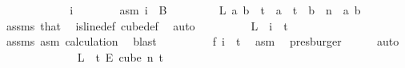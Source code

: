 \begin{isabellebody}
\ \ \ \ \isamarkupfalse%
\isanewline
\ \ \ \ \ \ \isamarkupfalse%
\ i\isanewline
\ \ \ \ \ \ \isamarkupfalse%
\ asm{\isacharcolon}{\kern0pt}\ {\isachardoublequoteopen}i\ {\isasymin}\ {\isacharparenleft}{\kern0pt}B\ {}{\isacharparenright}{\kern0pt}{\isachardoublequoteclose}\isanewline
\ \ \ \ \ \ \isamarkupfalse%
\ {\isachardoublequoteopen}L\ a\ b\ {\isasymin}\ {\isacharbraceleft}{\kern0pt}{\isachardot}{\kern0pt}{\isachardot}{\kern0pt}{\isacharless}{\kern0pt}t{\isacharbraceright}{\kern0pt}{\isachardoublequoteclose}\ \ {\isachardoublequoteopen}a\ {\isacharless}{\kern0pt}\ t{\isachardoublequoteclose}\ \ {\isachardoublequoteopen}b\ {\isacharless}{\kern0pt}\ n{\isachardoublequoteclose}\ \ a\ b\ \isamarkupfalse%
\ assms{\isacharparenleft}{\kern0pt}{}{\isacharparenright}{\kern0pt}\ that\ \isamarkupfalse%
\ is{\isacharunderscore}{\kern0pt}line{\isacharunderscore}{\kern0pt}def\ cube{\isacharunderscore}{\kern0pt}def\ \isamarkupfalse%
\ auto\isanewline
\ \ \ \ \ \ \isamarkupfalse%
\ \isamarkupfalse%
\ {\isachardoublequoteopen}L\ {}\ i\ {\isasymin}\ {\isacharbraceleft}{\kern0pt}{\isachardot}{\kern0pt}{\isachardot}{\kern0pt}{\isacharless}{\kern0pt}t{\isacharbraceright}{\kern0pt}{\isachardoublequoteclose}\ \isamarkupfalse%
\ assms{\isacharparenleft}{\kern0pt}{}{\isacharparenright}{\kern0pt}\ asm\ calculation{\isacharparenleft}{\kern0pt}{}{\isacharparenright}{\kern0pt}\ \isamarkupfalse%
\ blast\isanewline
\ \ \ \ \ \ \isamarkupfalse%
\ \isamarkupfalse%
\ {\isachardoublequoteopen}{\isacharquery}{\kern0pt}f\ i\ {\isasymin}\ {\isacharbraceleft}{\kern0pt}{\isachardot}{\kern0pt}{\isachardot}{\kern0pt}{\isacharless}{\kern0pt}t{\isacharbraceright}{\kern0pt}{\isachardoublequoteclose}\ \isamarkupfalse%
\ asm\ \isamarkupfalse%
\ presburger\isanewline
\ \ \ \ \isamarkupfalse%
\ {\isacharparenleft}{\kern0pt}auto{\isacharparenright}{\kern0pt}\isanewline
\ \ \isacommand{{\isacharbraceright}{\kern0pt}}\isamarkupfalse%
\isanewline
\isanewline
\ \ \isamarkupfalse%
\isanewline
\ \ \isacommand{{\isacharbraceleft}{\kern0pt}}\isamarkupfalse%
\isanewline
\ \ \ \ \isamarkupfalse%
\ {\isachardoublequoteopen}L\ {\isasymin}\ {\isacharbraceleft}{\kern0pt}{\isachardot}{\kern0pt}{\isachardot}{\kern0pt}{\isacharless}{\kern0pt}t{\isacharbraceright}{\kern0pt}\ {\isasymrightarrow}\isactrlsub E\ {\isacharparenleft}{\kern0pt}cube\ n\ t{\isacharparenright}{\kern0pt}{\isachardoublequoteclose}\ \isamarkupfalse%

\end{isabellebody}
